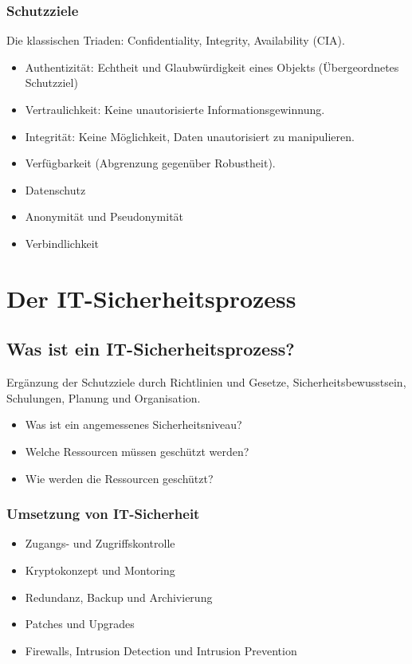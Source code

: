 \subsubsection{Schutzziele}

Die klassischen Triaden: Confidentiality, Integrity, Availability (CIA).

\begin{itemize}
	\item Authentizität: Echtheit und Glaubwürdigkeit eines Objekts (Übergeordnetes Schutzziel)
	\item Vertraulichkeit: Keine unautorisierte Informationsgewinnung.
	\item Integrität: Keine Möglichkeit, Daten unautorisiert zu manipulieren.
	\item Verfügbarkeit (Abgrenzung gegenüber Robustheit).
	\item Datenschutz
	\item Anonymität und Pseudonymität
	\item Verbindlichkeit
\end{itemize}



\section{Der IT-Sicherheitsprozess}

\subsection{Was ist ein IT-Sicherheitsprozess?}

Ergänzung der Schutzziele durch Richtlinien und Gesetze, Sicherheitsbewusstsein, Schulungen, Planung und Organisation.

\begin{itemize}
	\item Was ist ein angemessenes Sicherheitsniveau?
	\item Welche Ressourcen müssen geschützt werden?
	\item Wie werden die Ressourcen geschützt?
\end{itemize}

\subsubsection{Umsetzung von IT-Sicherheit}
\begin{itemize}
	\item Zugangs- und Zugriffskontrolle
	\item Kryptokonzept und Montoring
	\item Redundanz, Backup und Archivierung
	\item Patches und Upgrades
	\item Firewalls, Intrusion Detection und Intrusion Prevention
\end{itemize}

